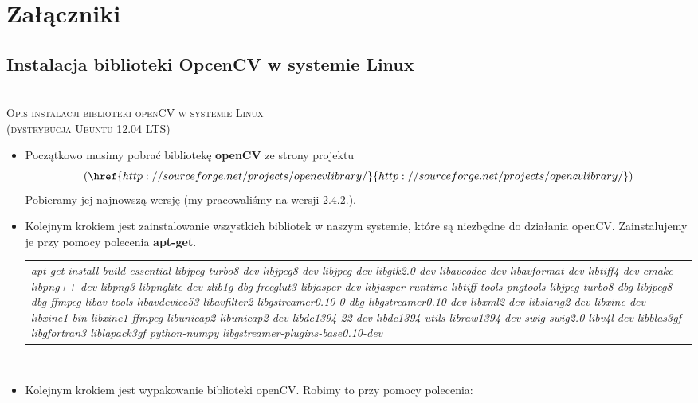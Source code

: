 
\section{Załączniki}
\subsection{Instalacja biblioteki OpcenCV w systemie Linux}
\begin{center}
\HRule \\[0.4cm]
\textsc{\Large Opis instalacji biblioteki openCV w systemie Linux\\ (dystrybucja Ubuntu 12.04 LTS)}
\HRule \\[0.4cm]
\end{center}

\begin{itemize}
\item Początkowo musimy pobrać bibliotekę \textbf{openCV} ze strony projektu 
\[
(\href{http://sourceforge.net/projects/opencvlibrary/}{http://sourceforge.net/projects/opencvlibrary/})
\]
 Pobieramy jej najnowszą wersję (my pracowaliśmy na wersji 2.4.2.).\\

\item Kolejnym krokiem jest zainstalowanie wszystkich bibliotek w naszym systemie, które są niezbędne do działania openCV. Zainstalujemy je przy pomocy polecenia \textbf{apt-get}. \\  

\begin{tabular}{p{15cm}}
 \textit{
apt-get install build-essential libjpeg-turbo8-dev libjpeg8-dev libjpeg-dev libgtk2.0-dev libavcodec-dev libavformat-dev libtiff4-dev cmake libpng++-dev libpng3
libpnglite-dev
zlib1g-dbg
freeglut3 libjasper-dev libjasper-runtime
libtiff-tools pngtools
libjpeg-turbo8-dbg libjpeg8-dbg
ffmpeg libav-tools libavdevice53 libavfilter2
libgstreamer0.10-0-dbg libgstreamer0.10-dev libxml2-dev
libslang2-dev libxine-dev libxine1-bin libxine1-ffmpeg
libunicap2 libunicap2-dev
libdc1394-22-dev libdc1394-utils libraw1394-dev
swig swig2.0
 libv4l-dev
libblas3gf libgfortran3 liblapack3gf python-numpy
libgstreamer-plugins-base0.10-dev}\\

\end{tabular} \\ 



\item Kolejnym krokiem jest wypakowanie biblioteki openCV. Robimy to przy pomocy polecenia: 


\end{itemize}
